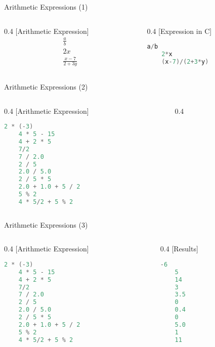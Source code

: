 \begin{frame}[fragile]{Arithmetic Expressions (1)}
\begin{columns}
\begin{column}{0.4\linewidth}
[Arithmetic Expression]
\begin{equation}
	\begin{aligned}
	\frac{a}{b}\\
	2x \\
	\frac{x-7}{2+3y} \nonumber
	\end{aligned}
\end{equation}
\end{column}
\begin{column}{0.4\linewidth}
[Expression in C]
	\begin{lstlisting}[numbers=none, language=c]
	a/b
	2*x
	(x-7)/(2+3*y)
	\end{lstlisting}
\end{column}
\end{columns}
\end{frame}

\begin{frame}[fragile]{Arithmetic Expressions (2)}
\begin{columns}
\begin{column}{0.4\linewidth}
[Arithmetic Expression]
	\begin{lstlisting}[numbers=none, language=c, frame=none]
	2 * (-3)
	4 * 5 - 15
	4 + 2 * 5
	7/2
	7 / 2.0
	2 / 5
	2.0 / 5.0
	2 / 5 * 5
	2.0 + 1.0 + 5 / 2
	5 % 2
	4 * 5/2 + 5 % 2
	\end{lstlisting}
\end{column}
\begin{column}{0.4\linewidth}

\end{column}
\end{columns}
\end{frame}

\begin{frame}[fragile]{Arithmetic Expressions (3)}
\begin{columns}
\begin{column}{0.4\linewidth}
[Arithmetic Expression]
	\begin{lstlisting}[numbers=none, language=c, frame=none]
	2 * (-3)
	4 * 5 - 15
	4 + 2 * 5
	7/2
	7 / 2.0
	2 / 5
	2.0 / 5.0
	2 / 5 * 5
	2.0 + 1.0 + 5 / 2
	5 % 2
	4 * 5/2 + 5 % 2
	\end{lstlisting}
\end{column}
\begin{column}{0.4\linewidth}
[Results]
	\begin{lstlisting}[numbers=none, language=c, frame=none]
	-6
	5
	14
	3
	3.5
	0
	0.4
	0
	5.0
	1
	11
	\end{lstlisting}
\end{column}
\end{columns}
\end{frame}


